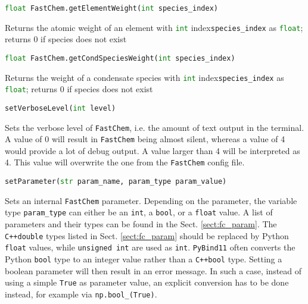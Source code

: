 \documentclass[numbers=noenddot]{aux/fcmanual}
\newcommand{\fc}{\texttt{FastChem}\xspace}
\newcommand{\cpp}{\ttt{C++}\xspace}
\newcommand{\pb}{\texttt{PyBind11}\xspace}
\newcommand{\ttt}[1]{\texttt {#1}}
\begin{document}
\lstinline[language=Python]!float FastChem.getElementWeight(int species_index)!
\begin{addmargin}[25pt]{0pt}
	Returns the atomic weight of an element with \lstinline[language=Python]!int! index\footnotemark[\value{footnote}] \lstinline!species_index! as \lstinline[language=Python]!float!; returns 0 if species does not exist
\end{addmargin}

\bigbreak

\lstinline[language=Python]!float FastChem.getCondSpeciesWeight(int species_index)!
\begin{addmargin}[25pt]{0pt}
	Returns the weight of a condensate species with \lstinline[language=Python]!int! index\footnotemark[\value{footnote}] \lstinline!species_index! as \lstinline[language=Python]!float!; returns 0 if species does not exist
\end{addmargin}


\bigbreak

\lstinline[language=Python]!setVerboseLevel(int level)!
\begin{addmargin}[25pt]{0pt}
	Sets the verbose level of \fc, i.e. the amount of text output in the terminal. A value of 0 will result in \fc being almost silent, whereas a value of 4 would provide a lot of debug output. A value larger than 4 will be interpreted as 4. This value will overwrite the one from the \fc config file.
\end{addmargin}

\bigbreak

\lstinline[language=Python]!setParameter(str param_name, param_type param_value)!
\begin{addmargin}[25pt]{0pt}
  Sets an internal \fc parameter. Depending on the parameter, the variable type \lstinline!param_type! can either be an \lstinline!int!, a \lstinline!bool!, or a \lstinline!float! value. A list of parameters and their types can be found in the Sect. \ref{sect:fc_param}. The \cpp \lstinline!double! types listed in Sect. \ref{sect:fc_param} should be replaced by Python \lstinline!float! values, while  \lstinline!unsigned int! are used as  \lstinline!int!. \pb often converts the Python \lstinline!bool! type to an integer value rather than a \cpp  \lstinline!bool! type. Setting a boolean parameter will then result in an error message. In such a case, instead of using a simple \lstinline!True! as parameter value, an explicit conversion has to be done instead, for example via \lstinline!np.bool_(True)!.
\end{addmargin}





  
\end{document}
